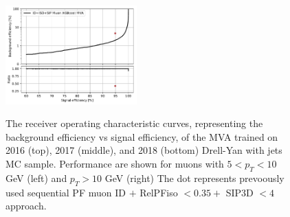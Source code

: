 \begin{figure}[!htb]
\begin{center}
      \includegraphics[width=0.45\textwidth]{Figures/Muons/2018_pT_10.pdf} \\
   \caption{The receiver operating characteristic curves, representing the background efficiency vs signal efficiency, of the MVA trained on 2016 (top), 2017
   (middle), and 2018 (bottom) Drell-Yan with jets MC sample. Performance are shown for muons with $5 < p_T < 10 $ GeV (left) and $p_T > 10$ GeV (right) The dot
   represents prevoously used sequential PF muon ID $+$ RelPFiso $< 0.35 +$ SIP3D $< 4$ approach.
   \label{fig:mu_ID_ISO_SIP_ROC}}
   \end{center}
\end{figure}


